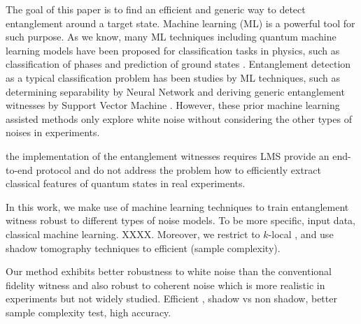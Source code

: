 \documentclass[
aps,
pra,
twocolumn,
floatfix,
]{revtex4-2}
\theoremstyle{plain}
\theoremstyle{definition}
\begin{document}




The goal of this paper is to find an efficient and generic way to detect entanglement around a target state. 
Machine learning (ML) is a powerful tool for such purpose. 
As we know, many ML techniques including quantum machine learning models \cite{congQuantumConvolutionalNeural2019} have been proposed for classification tasks in physics, such as classification of phases and prediction of ground states \cite{carrasquillaMachineLearningPhases2017,huangProvablyEfficientMachine2022}.
Entanglement detection as a typical classification problem has been studies by ML techniques, such as determining separability by Neural Network \cite{luSeparabilityEntanglementClassifierMachine2018} \cite{maTransformingBellInequalities2018} and deriving generic entanglement witnesses by Support Vector Machine \cite{zhuMachineLearningDerivedEntanglement2021} \cite{vintskevichClassificationFourqubitEntangled2022}. 
However, these prior machine learning assisted methods 
only explore  white noise without considering the other types of noises in experiments.

the implementation of the entanglement witnesses requires LMS
provide an end-to-end protocol
and do not address the problem how to efficiently extract classical features of quantum states in real experiments.

In this work, we make use of machine learning techniques to train entanglement witness robust to different types of noise models. To be more specific, input data, classical machine learning. XXXX. Moreover, we restrict  to $k$-local , and use shadow tomography techniques to efficient   (sample complexity). 


Our method exhibits better robustness to white noise than the conventional fidelity witness and also robust to coherent noise which is more realistic in experiments but not widely studied. Efficient ,  shadow vs non shadow, better sample complexity 
test, high accuracy. 
\end{document}
